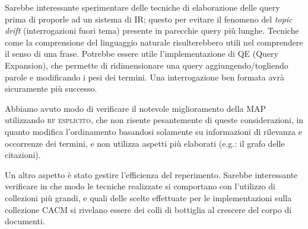 \documentclass{llncs}
\begin{document}
Sarebbe interessante sperimentare delle tecniche di elaborazione delle query prima di proporle ad un sistema di IR; questo per evitare il fenomeno del \textit{topic drift} (interrogazioni fuori tema) presente in parecchie query pi\`u lunghe. Tecniche come la comprensione del linguaggio naturale risulterebbero utili nel comprendere il senso di una frase. Potrebbe essere utile l'implementazione di QE (Query Expansion), che permette di ridimensionare una query aggiungendo/togliendo parole e modificando i pesi dei termini. Una interrogazione ben formata avr\`a sicuramente pi\`u successo.

Abbiamo avuto modo di verificare il notevole miglioramento della MAP utilizzando \textsc{rf esplicito}, che non risente pesantemente di queste considerazioni, in quanto modifica l'ordinamento basandosi solamente su informazioni di rilevanza e occorrenze dei termini, e non utilizza aspetti pi\`u elaborati (e.g.: il grafo delle citazioni).

Un altro aspetto \`e stato gestire l'efficienza del reperimento. Sarebbe interessante verificare in che modo le tecniche realizzate si comportano con l'utilizzo di collezioni pi\`u grandi, e quali delle scelte effettuate per le implementazioni sulla collezione CACM si rivelano essere dei colli di bottiglia al crescere del corpo di documenti.




\end{document}
